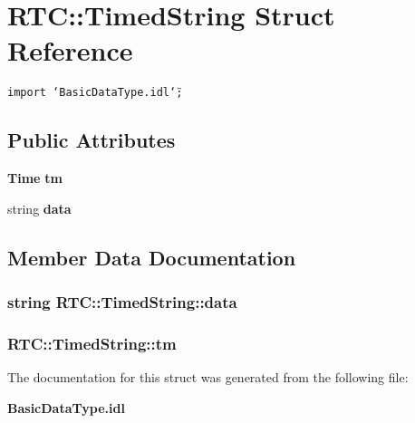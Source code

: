 \section{RTC::Timed\-String Struct Reference}
\label{structRTC_1_1TimedString}
{\tt import \char`\"{}Basic\-Data\-Type.idl\char`\"{};}

\subsection*{Public Attributes}
\begin{CompactItemize}
\item 
{\bf Time} {\bf tm}
\item 
string {\bf data}
\end{CompactItemize}


\subsection{Member Data Documentation}
\subsubsection{\setlength{\rightskip}{0pt plus 5cm}string {\bf RTC::Timed\-String::data}}\label{structRTC_1_1TimedString_RTC_1_1TimedStringo1}


\subsubsection{ {\bf RTC::Timed\-String::tm}}\label{structRTC_1_1TimedString_RTC_1_1TimedStringo0}




The documentation for this struct was generated from the following file:\begin{CompactItemize}
\item 
{\bf Basic\-Data\-Type.idl}\end{CompactItemize}
